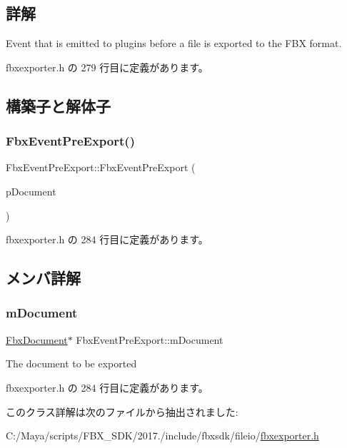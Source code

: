 \subsection{詳解}
Event that is emitted to plugins before a file is exported to the F\+BX format. 

 fbxexporter.\+h の 279 行目に定義があります。



\subsection{構築子と解体子}
\mbox{\label{class_fbx_event_pre_export_a90642ec2d709d7bbb898df8248f848ba}} 
\subsubsection{\texorpdfstring{Fbx\+Event\+Pre\+Export()}{FbxEventPreExport()}}
{\footnotesize\ttfamily Fbx\+Event\+Pre\+Export\+::\+Fbx\+Event\+Pre\+Export (\begin{DoxyParamCaption}\item[{\hyperlink{class_fbx_document}{Fbx\+Document} $\ast$}]{p\+Document }\end{DoxyParamCaption})\hspace{0.3cm}{\ttfamily [inline]}}



 fbxexporter.\+h の 284 行目に定義があります。



\subsection{メンバ詳解}
\mbox{\label{class_fbx_event_pre_export_aee74a30348fc851b3690a90c99b0a4b8}} 
\subsubsection{\texorpdfstring{m\+Document}{mDocument}}
{\footnotesize\ttfamily \hyperlink{class_fbx_document}{Fbx\+Document}$\ast$ Fbx\+Event\+Pre\+Export\+::m\+Document}



The document to be exported 



 fbxexporter.\+h の 284 行目に定義があります。



このクラス詳解は次のファイルから抽出されました\+:\begin{DoxyCompactItemize}
\item 
C\+:/\+Maya/scripts/\+F\+B\+X\+\_\+\+S\+D\+K/2017./include/fbxsdk/fileio/\hyperlink{fbxexporter_8h}{fbxexporter.\+h}\end{DoxyCompactItemize}
